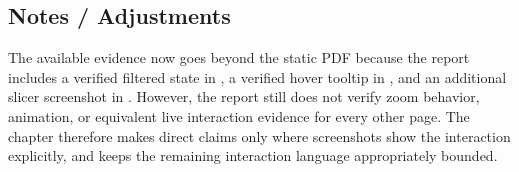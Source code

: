 \documentclass[../main.tex]{subfiles}
\begin{document}
\subsection{Notes / Adjustments}

The available evidence now goes beyond the static PDF because the report
includes a verified filtered state in ,
a verified hover tooltip in ,
and an additional slicer screenshot in .
However, the report still does not verify zoom behavior, animation, or
equivalent live interaction evidence for every other page. The chapter
therefore makes direct claims only where screenshots show the interaction
explicitly, and keeps the remaining interaction language appropriately bounded.
\end{document}
